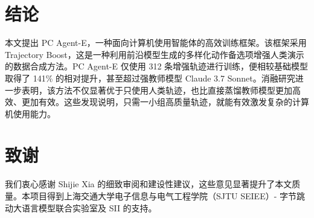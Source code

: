 \documentclass[10pt]{article}
\begin{document}
\section{结论}

本文提出 PC Agent-E，一种面向计算机使用智能体的高效训练框架。该框架采用 Trajectory Boost，这是一种利用前沿模型生成的多样化动作备选项增强人类演示的数据合成方法。PC Agent-E 仅使用 312 条增强轨迹进行训练，便相较基础模型取得了 141\% 的相对提升，甚至超过强教师模型 Claude 3.7 Sonnet。消融研究进一步表明，该方法不仅显著优于只使用人类轨迹，也比直接蒸馏教师模型更加高效、更加有效。这些发现说明，只需一小组高质量轨迹，就能有效激发复杂的计算机使用能力。

\section*{致谢}

我们衷心感谢 Shijie Xia 的细致审阅和建设性建议，这些意见显著提升了本文质量。本项目得到上海交通大学电子信息与电气工程学院（SJTU SEIEE）- 字节跳动大语言模型联合实验室及 SII 的支持。



\end{document}
